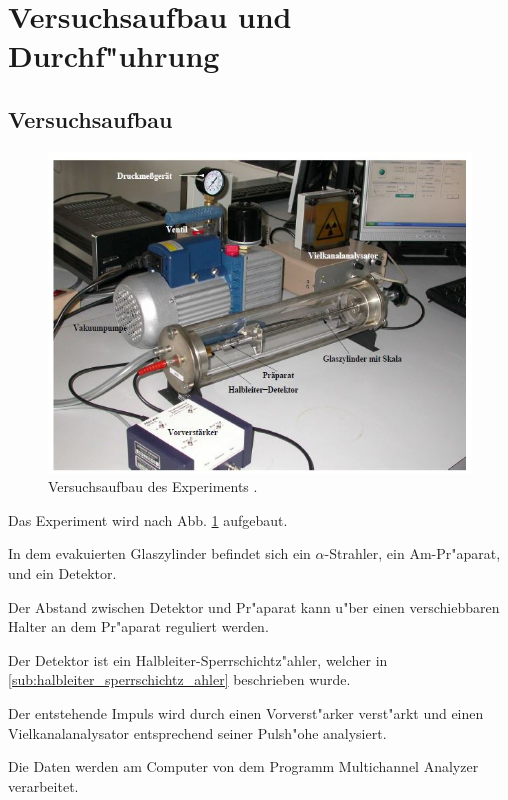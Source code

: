 \section{Versuchsaufbau und Durchf"uhrung} %

\label{sec:durchf_uhrung}
	
	\subsection{Versuchsaufbau} %
	\label{sub:versuchsaufbau}
	
	\begin{figure}[!h]
		\centering
		\includegraphics[width = 13cm]{img/Aufbau.JPG}
		\caption{Versuchsaufbau des Experiments \cite{anleitung}.}
		\label{fg:aufbau}
	\end{figure}

	Das Experiment wird nach Abb. \ref{fg:aufbau} aufgebaut.

	In dem evakuierten Glaszylinder befindet sich ein $\alpha$-Strahler, ein Am-Pr"aparat, und ein Detektor.

	Der Abstand zwischen Detektor und Pr"aparat kann u"ber einen verschiebbaren Halter an dem Pr"aparat reguliert werden.

	Der Detektor ist ein Halbleiter-Sperrschichtz"ahler, welcher in \ref{sub:halbleiter_sperrschichtz_ahler} beschrieben wurde.

	Der entstehende Impuls wird durch einen Vorverst"arker verst"arkt und einen Vielkanalanalysator entsprechend seiner Pulsh"ohe analysiert.

	Die Daten werden am Computer von dem Programm Multichannel 
	Analyzer verarbeitet.

